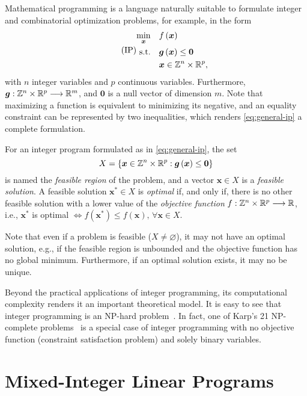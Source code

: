 Mathematical programming is a language naturally suitable to formulate integer and combinatorial optimization problems, for example, in the form
\begin{equation}\label{eq:general-ip}\tag{IP}
    \begin{split}
	\min_{\bm{x}} \quad & f\left( \bm{x} \right) \\
	\textrm{s.t.} \quad & \bm{g}\left( \bm{x} \right) \le \bm{0} \\
	  & \bm{x} \in \mathbb{Z}^{n}\times \mathbb{R}^{p}
    ,\end{split}
\end{equation}
with $n$ integer variables and $p$ continuous variables.
Furthermore, $\bm{g}: \mathbb{Z}^{n}\times \mathbb{R}^{p} \longrightarrow \mathbb{R}^{m}$,  and $\bm{0}$ is a null vector of dimension $m$.
Note that maximizing a function is equivalent to minimizing its negative, and an equality constraint can be represented by two inequalities, which renders \eqref{eq:general-ip} a complete formulation.

For an integer program formulated as in \eqref{eq:general-ip}, the set \[
X=\left\{ \bm{x}\in \mathbb{Z}^{n}\times \mathbb{R}^{p}: \bm{g}\left( \bm{x} \right) \le \bm{0}\right\} 
\] is named the \emph{feasible region} of the problem, and a vector $\bm{x}\in X$ is a \emph{feasible solution}.
A feasible solution $\bm{x}^{*}\in X$ is \emph{optimal} if, and only if, there is no other feasible solution with a lower value of the \emph{objective function} $f: \mathbb{Z}^{n}\times \mathbb{R}^{p} \longrightarrow \mathbb{R}$, i.e., $\bm{x}^{*}$ is optimal $\iff f(\bm{x}^{*}) \le f(\bm{x}) ,\,\forall \bm{x}\in X$.

Note that even if a problem is feasible ($X\neq \varnothing$), it may not have an optimal solution, e.g., if the feasible region is unbounded and the objective function has no global minimum.
Furthermore, if an optimal solution exists, it may no be unique.

Beyond the practical applications of integer programming, its computational complexity renders it an important theoretical model.
It is easy to see that integer programming is an NP-hard problem~\cite{nemhauserIntegerCombinatorialOptimization1999}.
In fact, one of Karp's 21 NP-complete problems~\cite{karpReducibilityCombinatorialProblems1972} is a special case of integer programming with no objective function (constraint satisfaction problem) and solely binary variables.

\section{Mixed-Integer Linear Programs}

